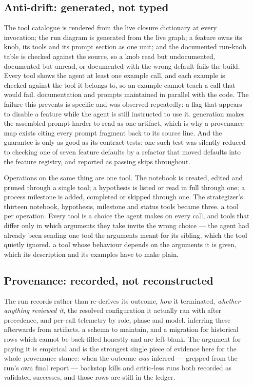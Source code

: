 \subsection{Anti-drift: generated, not typed}
\label{sec:antidrift}

{The tool catalogue is rendered from the live closure dictionary at every
invocation; the run diagram is generated from the live graph; a feature owns
its knob, its tools and its prompt section as one unit; and the documented
run-knob table is checked against the source, so a knob read but undocumented,
documented but unread, or documented with the wrong default fails the build.
Every tool shows the agent at least one example call, and each example is
checked against the tool it belongs to, so an example cannot teach a call that
would fail.}
{documentation and prompts maintained in parallel with the code. The failure
this prevents is specific and was observed repeatedly: a flag that appears to
disable a feature while the agent is still instructed to use it.}
{generation makes the assembled prompt harder to read as one artifact, which is
why a provenance map exists citing every prompt fragment back to its source
line. And the guarantee is only as good as its contract tests: one such test
was silently reduced to checking one of seven feature defaults by a refactor
that moved defaults into the feature registry, and reported as passing skips
throughout.}

{Operations on the same thing are one tool. The notebook is created, edited and
pruned through a single tool; a hypothesis is listed or read in full through
one; a process milestone is added, completed or skipped through one. The
strategizer's thirteen notebook, hypothesis, milestone and status tools became
three.}
{a tool per operation. Every tool is a choice the agent makes on every call,
and tools that differ only in which arguments they take invite the wrong
choice --- the agent had already been sending one tool the arguments meant
for its sibling, which the tool quietly ignored.}
{a tool whose behaviour depends on the arguments it is given, which its
description and its examples have to make plain.}

\subsection{Provenance: recorded, not reconstructed}

{The run records rather than re-derives its outcome, \emph{how} it terminated,
\emph{whether anything reviewed it}, the resolved configuration it actually ran
with after precedence, and per-call telemetry by role, phase and model.}
{inferring these afterwards from artifacts.}
{a schema to maintain, and a migration for historical rows which cannot be
back-filled honestly and are left blank. The argument for paying it is
empirical and is the strongest single piece of evidence here for the whole
provenance stance: when the outcome \emph{was} inferred --- grepped from the
run's own final report --- backstop kills and critic-less runs both recorded as
validated successes, and those rows are still in the ledger.}

